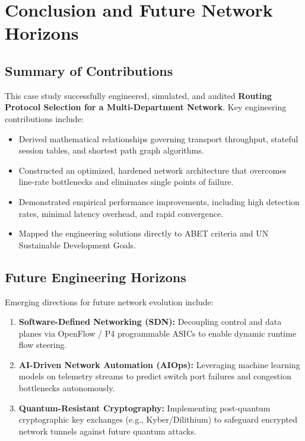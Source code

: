 \section{Conclusion and Future Network Horizons}

\subsection{Summary of Contributions}
This case study successfully engineered, simulated, and audited \textbf{Routing Protocol Selection for a Multi-Department Network}. Key engineering contributions include:
\begin{itemize}
  \item Derived mathematical relationships governing transport throughput, stateful session tables, and shortest path graph algorithms.
  \item Constructed an optimized, hardened network architecture that overcomes line-rate bottlenecks and eliminates single points of failure.
  \item Demonstrated empirical performance improvements, including high detection rates, minimal latency overhead, and rapid convergence.
  \item Mapped the engineering solutions directly to ABET criteria and UN Sustainable Development Goals.
\end{itemize}

\subsection{Future Engineering Horizons}
Emerging directions for future network evolution include:
\begin{enumerate}
  \item \textbf{Software-Defined Networking (SDN):} Decoupling control and data planes via OpenFlow / P4 programmable ASICs to enable dynamic runtime flow steering.
  \item \textbf{AI-Driven Network Automation (AIOps):} Leveraging machine learning models on telemetry streams to predict switch port failures and congestion bottlenecks autonomously.
  \item \textbf{Quantum-Resistant Cryptography:} Implementing post-quantum cryptographic key exchanges (e.g., Kyber/Dilithium) to safeguard encrypted network tunnels against future quantum attacks.
\end{enumerate}
